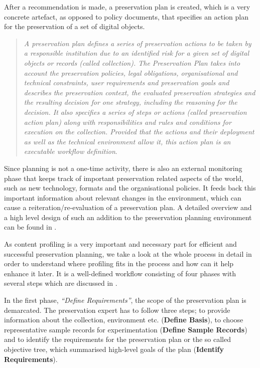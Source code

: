 After a recommendation is made, a preservation plan is created, which is a very concrete artefact, as opposed to policy documents, that specifies an action plan for the preservation of a set of digital objects.

\begin{quote}
\textit{A preservation plan defines a series of preservation actions to be taken by a responsible institution due to an identified risk for a given set of digital objects or records (called collection). The Preservation Plan takes into account the preservation policies, legal obligations, organisational and technical constraints, user requirements and preservation goals and describes the preservation context, the evaluated preservation strategies and the resulting decision for one strategy, including the reasoning for the decision. It also specifies a series of steps or actions (called preservation action plan) along with responsibilities and rules and conditions for execution on the collection. Provided that the actions and their deployment as well as the technical environment allow it, this action plan is an executable workflow definition}\cite{Becker:2009fk}.
\end{quote}

Since planning is not a one-time activity, there is also an external monitoring phase that keeps track of important preservation related aspects of the world, such as new technology, formats and the organisational policies. It feeds back this important information about relevant changes in the environment, which can cause a reiteration/re-evaluation of a preservation plan. A detailed overview and a high level design of such an addition to the preservation planning environment can be found in \cite{duretec:2012:watch}.

As content profiling is a very important and necessary part for efficient and successful preservation planning, we take a look at the whole process in detail in order to understand where profiling fits in the process and how can it help enhance it later. It is a well-defined workflow consisting of four phases with several steps which are discussed in \cite{STR07_jcdl}.

In the first phase, \textit{``Define Requirements''}, the scope of the preservation plan is demarcated. The preservation expert has to follow three steps; to provide information about the collection, environment etc. (\textbf{Define Basis}), to choose representative sample records for experimentation (\textbf{Define Sample Records}) and to identify the requirements for the preservation plan or the so called objective tree, which summarised high-level goals of the plan (\textbf{Identify Requirements}). 

